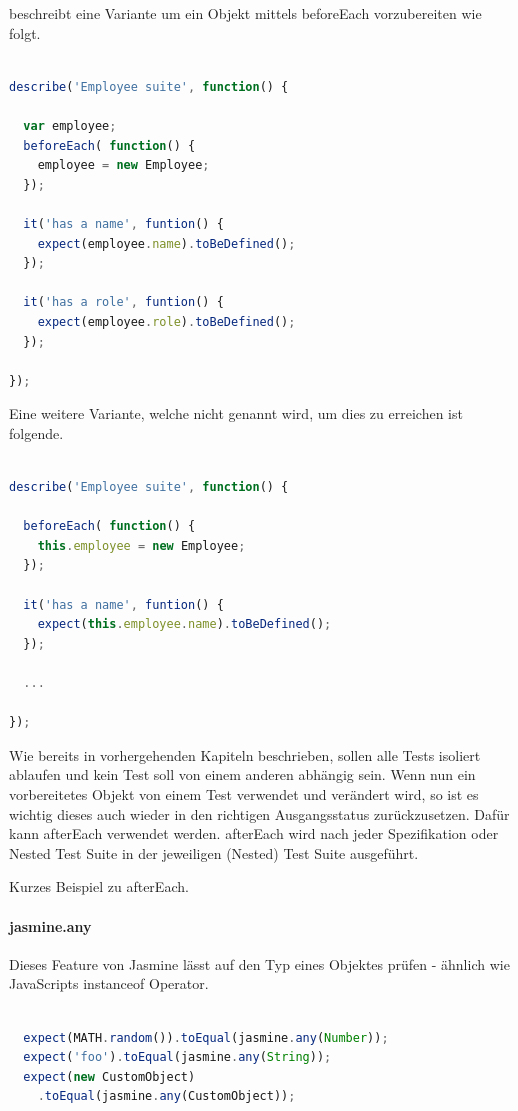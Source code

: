 \cite[23]{Hahn:2013} beschreibt eine Variante um ein Objekt mittels beforeEach vorzubereiten wie folgt.
\begin{lstlisting}[language=JavaScript]

describe('Employee suite', function() {

  var employee;
  beforeEach( function() {
    employee = new Employee;
  });

  it('has a name', funtion() {
    expect(employee.name).toBeDefined();
  });

  it('has a role', funtion() {
    expect(employee.role).toBeDefined();
  });

});

\end{lstlisting}

Eine weitere Variante, welche nicht genannt wird, um dies zu erreichen ist folgende.

\begin{lstlisting}[language=JavaScript]

describe('Employee suite', function() {

  beforeEach( function() {
    this.employee = new Employee;
  });

  it('has a name', funtion() {
    expect(this.employee.name).toBeDefined();
  });

  ...

});
\end{lstlisting}

Wie bereits in vorhergehenden Kapiteln beschrieben, sollen alle Tests isoliert ablaufen und kein Test soll von einem anderen abhängig sein. Wenn nun ein vorbereitetes Objekt von einem Test verwendet und verändert wird, so ist es wichtig dieses auch wieder in den richtigen Ausgangsstatus zurückzusetzen. Dafür kann afterEach verwendet werden. afterEach wird nach jeder Spezifikation oder Nested Test Suite in der jeweiligen (Nested) Test Suite ausgeführt.

Kurzes Beispiel zu afterEach.

\paragraph{jasmine.any}
Dieses Feature von Jasmine lässt auf den Typ eines Objektes prüfen - ähnlich wie JavaScripts instanceof Operator.
\begin{lstlisting}[language=JavaScript]

  expect(MATH.random()).toEqual(jasmine.any(Number));
  expect('foo').toEqual(jasmine.any(String));
  expect(new CustomObject)
    .toEqual(jasmine.any(CustomObject));

\end{lstlisting}

